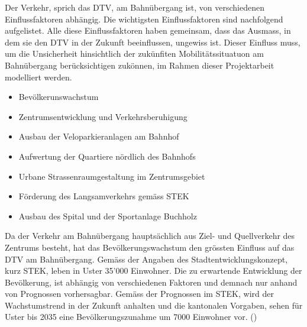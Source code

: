 %
%
%
%



Der Verkehr, sprich das DTV, am Bahnübergang ist, von verschiedenen Einflussfaktoren abhängig. 
Die wichtigsten Einflussfaktoren sind nachfolgend aufgelistet.  
Alle diese Einflussfaktoren haben gemeinsam, dass das Ausmass, in dem sie den DTV in der Zukunft beeinflussen, ungewiss ist. Dieser Einfluss muss, um die Unsicherheit hinsichtlich der zukünfiten Mobilitätssituatuon am Bahnübergang berücksichtigen zukönnen, im Rahmen dieser Projektarbeit modelliert werden. 

{
\begin{itemize}
\item Bevölkerunswachstum
\item Zentrumsentwicklung und Verkehrsberuhigung
\item Ausbau der Veloparkieranlagen am Bahnhof 
\item Aufwertung der Quartiere nördlich des Bahnhofs
\item Urbane Strassenraumgestaltung im Zentrumsgebiet
\item Förderung des Langsamverkehrs gemäss STEK 
\item Ausbau des Spital und der Sportanlage Buchholz
\end{itemize}
}

Da der Verkehr am Bahnübergang hauptsächlich aus Ziel- und Quellverkehr des Zentrums besteht, hat das Bevölkerungswachstum den grössten Einfluss auf das DTV am Bahnübergang. Gemäss der Angaben des Stadtentwicklungskonzept, kurz STEK, leben in Uster 35'000 Einwohner. Die zu erwartende Entwicklung der Bevölkerung, ist abhängig von verschiedenen Faktoren und demnach nur anhand von Prognossen vorhersagbar. Gemäss der Prognossen im STEK, wird der Wachstumstrend in der Zukunft anhalten und die kantonalen Vorgaben, sehen für Uster bis 2035 eine Bevölkerungszunahme um 7000 Einwohner vor.  (\cite{STEK})

